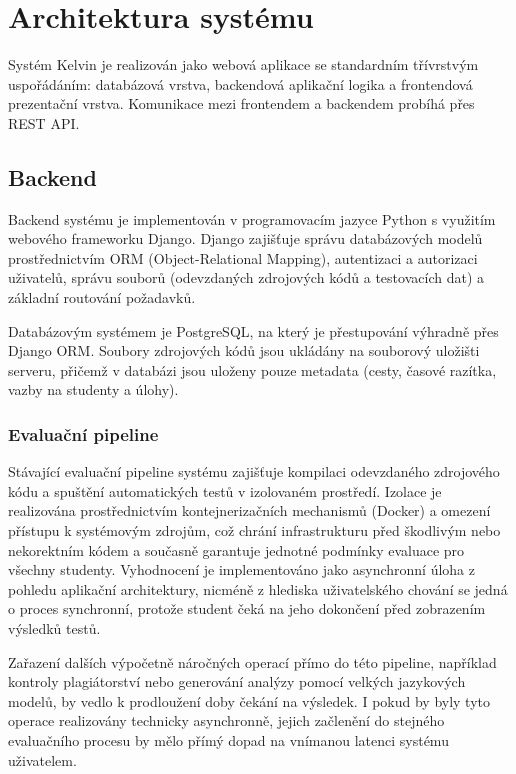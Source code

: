 \section{Architektura systému}
\label{sec:kelvin-architecture}

Systém Kelvin je realizován jako webová aplikace se standardním třívrstvým uspořádáním: databázová vrstva, backendová aplikační logika a frontendová prezentační vrstva.
Komunikace mezi frontendem a backendem probíhá přes REST API\@.

\subsection{Backend}
\label{subsec:kelvin-backend}

Backend systému je implementován v programovacím jazyce Python s využitím webového frameworku Django.
Django zajišťuje správu databázových modelů prostřednictvím ORM (Object-Relational Mapping), autentizaci a autorizaci uživatelů, správu souborů (odevzdaných zdrojových kódů a testovacích dat) a základní routování požadavků.

Databázovým systémem je PostgreSQL, na který je přestupování výhradně přes Django ORM\@.
Soubory zdrojových kódů jsou ukládány na souborový uložišti serveru, přičemž v databázi jsou uloženy pouze metadata (cesty, časové razítka, vazby na studenty a úlohy).

\subsubsection*{Evaluační pipeline}
\label{subsubsec:kelvin-evaluation-pipeline}

Stávající evaluační pipeline systému zajišťuje kompilaci odevzdaného zdrojového kódu a spuštění automatických testů v izolovaném prostředí.
Izolace je realizována prostřednictvím kontejnerizačních mechanismů (Docker) a omezení přístupu k systémovým zdrojům, což chrání infrastrukturu před škodlivým nebo nekorektním kódem a současně garantuje jednotné podmínky evaluace pro všechny studenty.
Vyhodnocení je implementováno jako asynchronní úloha z pohledu aplikační architektury, nicméně z hlediska uživatelského chování se jedná o proces synchronní, protože student čeká na jeho dokončení před zobrazením výsledků testů.

Zařazení dalších výpočetně náročných operací přímo do této pipeline, například kontroly plagiátorství nebo generování analýzy pomocí velkých jazykových modelů, by vedlo k prodloužení doby čekání na výsledek.
I pokud by byly tyto operace realizovány technicky asynchronně, jejich začlenění do stejného evaluačního procesu by mělo přímý dopad na vnímanou latenci systému uživatelem.

